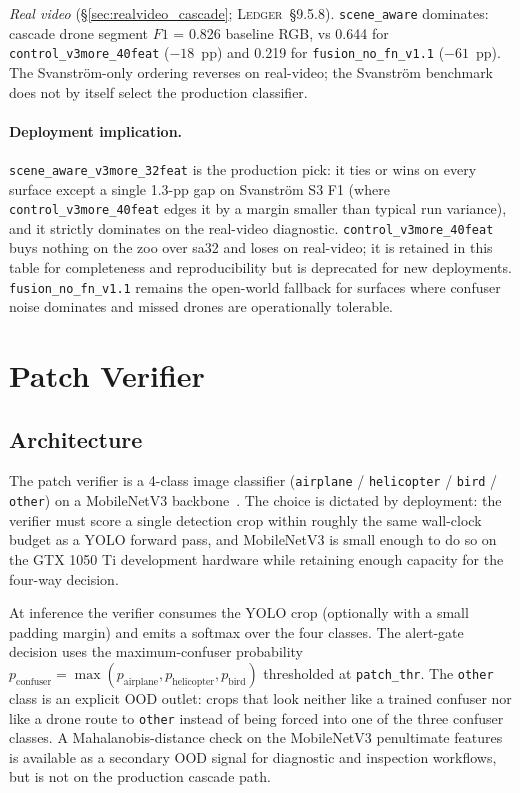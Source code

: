 \documentclass[12pt,a4paper,oneside,openright]{book}
\begin{document}
\emph{Real video} (\S\ref{sec:realvideo_cascade}; \textsc{Ledger}~\S9.5.8). \texttt{scene\_aware} dominates: cascade drone segment $F1$ = 0.826 baseline RGB, vs 0.644 for \texttt{control\_v3more\_40feat} ($-18$~pp) and 0.219 for \texttt{fusion\_no\_fn\_v1.1} ($-61$~pp). The Svanstr\"om-only ordering reverses on real-video; the Svanstr\"om benchmark does not by itself select the production classifier.

\paragraph{Deployment implication.}
\texttt{scene\_aware\_v3more\_32feat} is the production pick: it ties or wins on every surface except a single 1.3-pp gap on Svanstr\"om S3 F1 (where \texttt{control\_v3more\_40feat} edges it by a margin smaller than typical run variance), and it strictly dominates on the real-video diagnostic. \texttt{control\_v3more\_40feat} buys nothing on the zoo over sa32 and loses on real-video; it is retained in this table for completeness and reproducibility but is deprecated for new deployments. \texttt{fusion\_no\_fn\_v1.1} remains the open-world fallback for surfaces where confuser noise dominates and missed drones are operationally tolerable.

\section{Patch Verifier}
\label{sec:patch_verifier_arch}

\subsection{Architecture}

The patch verifier is a 4-class image classifier (\texttt{airplane} / \texttt{helicopter} / \texttt{bird} / \texttt{other}) on a MobileNetV3 backbone~\cite{howard2019mobilenetv3}. The choice is dictated by deployment: the verifier must score a single detection crop within roughly the same wall-clock budget as a YOLO forward pass, and MobileNetV3 is small enough to do so on the GTX 1050 Ti development hardware while retaining enough capacity for the four-way decision.

At inference the verifier consumes the YOLO crop (optionally with a small padding margin) and emits a softmax over the four classes. The alert-gate decision uses the maximum-confuser probability $p_\text{confuser} = \max(p_\text{airplane}, p_\text{helicopter}, p_\text{bird})$ thresholded at \texttt{patch\_thr}. The \texttt{other} class is an explicit OOD outlet: crops that look neither like a trained confuser nor like a drone route to \texttt{other} instead of being forced into one of the three confuser classes. A Mahalanobis-distance check on the MobileNetV3 penultimate features is available as a secondary OOD signal for diagnostic and inspection workflows, but is not on the production cascade path.
\end{document}
